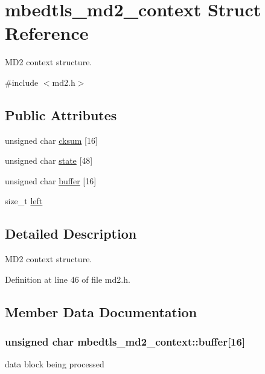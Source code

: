 \hypertarget{structmbedtls__md2__context}{\section{mbedtls\-\_\-md2\-\_\-context Struct Reference}
\label{structmbedtls__md2__context}
}


M\-D2 context structure.  




{\ttfamily \#include $<$md2.\-h$>$}

\subsection*{Public Attributes}
\begin{DoxyCompactItemize}
\item 
unsigned char \hyperlink{structmbedtls__md2__context_a12653607373c617159907a4b5d533c94}{cksum} \mbox{[}16\mbox{]}
\item 
unsigned char \hyperlink{structmbedtls__md2__context_a2849ae4cd7a078459349c046e97ae503}{state} \mbox{[}48\mbox{]}
\item 
unsigned char \hyperlink{structmbedtls__md2__context_ae08fe6f2378ed0bb8f226b8905924ad8}{buffer} \mbox{[}16\mbox{]}
\item 
size\-\_\-t \hyperlink{structmbedtls__md2__context_a5b070937560df586b3b20287cc6c4bbe}{left}
\end{DoxyCompactItemize}


\subsection{Detailed Description}
M\-D2 context structure. 

Definition at line 46 of file md2.\-h.



\subsection{Member Data Documentation}
\hypertarget{structmbedtls__md2__context_ae08fe6f2378ed0bb8f226b8905924ad8}{
\subsubsection[{buffer}]{\setlength{\rightskip}{0pt plus 5cm}unsigned char mbedtls\-\_\-md2\-\_\-context\-::buffer\mbox{[}16\mbox{]}}}\label{structmbedtls__md2__context_ae08fe6f2378ed0bb8f226b8905924ad8}
data block being processed 

